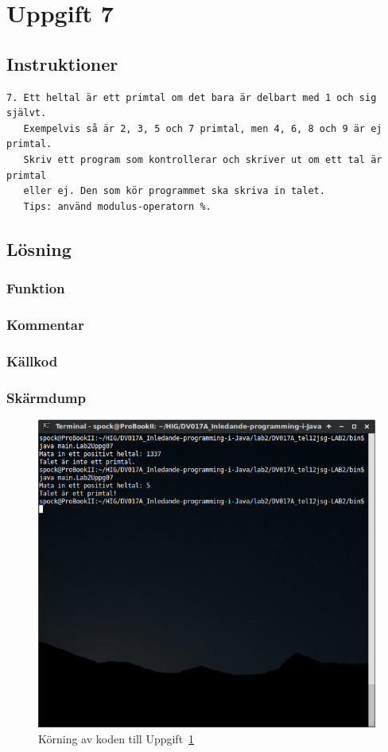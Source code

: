 \section{Uppgift 7}\label{sec:uppg07}

\subsection{Instruktioner}
\begin{verbatim}
7. Ett heltal är ett primtal om det bara är delbart med 1 och sig självt.
   Exempelvis så är 2, 3, 5 och 7 primtal, men 4, 6, 8 och 9 är ej primtal.
   Skriv ett program som kontrollerar och skriver ut om ett tal är primtal
   eller ej. Den som kör programmet ska skriva in talet.
   Tips: använd modulus-operatorn %.
\end{verbatim}


\subsection{Lösning}
\subsubsection{Funktion}

\subsubsection{Kommentar}


\subsubsection{Källkod}
\label{src:uppg07}


\subsubsection{Skärmdump}
\begin{figure}[htbp]
    \centering
        \includegraphics[width=\linewidth]{img/07.png}
    \caption{Körning av koden till Uppgift~\ref{sec:uppg07}}
    \label{fig:uppg07-screenshot}
\end{figure}


